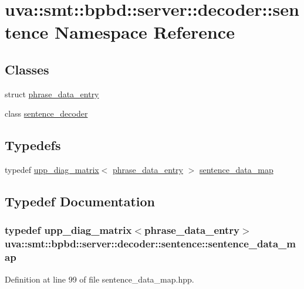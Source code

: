 \hypertarget{namespaceuva_1_1smt_1_1bpbd_1_1server_1_1decoder_1_1sentence}{}\section{uva\+:\+:smt\+:\+:bpbd\+:\+:server\+:\+:decoder\+:\+:sentence Namespace Reference}
\label{namespaceuva_1_1smt_1_1bpbd_1_1server_1_1decoder_1_1sentence}
\subsection*{Classes}
\begin{DoxyCompactItemize}
\item 
struct \hyperlink{structuva_1_1smt_1_1bpbd_1_1server_1_1decoder_1_1sentence_1_1phrase__data__entry}{phrase\+\_\+data\+\_\+entry}
\item 
class \hyperlink{classuva_1_1smt_1_1bpbd_1_1server_1_1decoder_1_1sentence_1_1sentence__decoder}{sentence\+\_\+decoder}
\end{DoxyCompactItemize}
\subsection*{Typedefs}
\begin{DoxyCompactItemize}
\item 
typedef \hyperlink{classuva_1_1utils_1_1containers_1_1upp__diag__matrix}{upp\+\_\+diag\+\_\+matrix}$<$ \hyperlink{structuva_1_1smt_1_1bpbd_1_1server_1_1decoder_1_1sentence_1_1phrase__data__entry}{phrase\+\_\+data\+\_\+entry} $>$ \hyperlink{namespaceuva_1_1smt_1_1bpbd_1_1server_1_1decoder_1_1sentence_a95d9e3bcc492d0c638368631e3701ebb}{sentence\+\_\+data\+\_\+map}
\end{DoxyCompactItemize}


\subsection{Typedef Documentation}
\hypertarget{namespaceuva_1_1smt_1_1bpbd_1_1server_1_1decoder_1_1sentence_a95d9e3bcc492d0c638368631e3701ebb}{}
\subsubsection[{sentence\+\_\+data\+\_\+map}]{\setlength{\rightskip}{0pt plus 5cm}typedef {\bf upp\+\_\+diag\+\_\+matrix}$<${\bf phrase\+\_\+data\+\_\+entry}$>$ {\bf uva\+::smt\+::bpbd\+::server\+::decoder\+::sentence\+::sentence\+\_\+data\+\_\+map}}\label{namespaceuva_1_1smt_1_1bpbd_1_1server_1_1decoder_1_1sentence_a95d9e3bcc492d0c638368631e3701ebb}


Definition at line 99 of file sentence\+\_\+data\+\_\+map.\+hpp.

